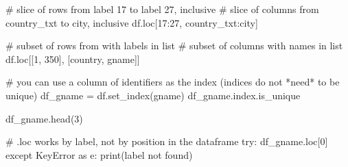 \documentclass[
  letterpaper,
  DIV=11,
  numbers=noendperiod]{scrreprt}
\newenvironment{Shaded}{\begin{snugshade}}{\end{snugshade}}
\newcommand{\BuiltInTok}[1]{\textcolor[rgb]{0.00,0.23,0.31}{#1}}
\newcommand{\CommentTok}[1]{\textcolor[rgb]{0.37,0.37,0.37}{#1}}
\newcommand{\ControlFlowTok}[1]{\textcolor[rgb]{0.00,0.23,0.31}{#1}}
\newcommand{\DecValTok}[1]{\textcolor[rgb]{0.68,0.00,0.00}{#1}}
\newcommand{\ImportTok}[1]{\textcolor[rgb]{0.00,0.46,0.62}{#1}}
\newcommand{\NormalTok}[1]{\textcolor[rgb]{0.00,0.23,0.31}{#1}}
\newcommand{\OperatorTok}[1]{\textcolor[rgb]{0.37,0.37,0.37}{#1}}
\newcommand{\PreprocessorTok}[1]{\textcolor[rgb]{0.68,0.00,0.00}{#1}}
\newcommand{\StringTok}[1]{\textcolor[rgb]{0.13,0.47,0.30}{#1}}
\begin{document}
\begin{Shaded}
\begin{Highlighting}[]
\CommentTok{\# slice of rows from label 17 to label 27, inclusive}
\CommentTok{\# slice of columns from country\_txt to city, inclusive}
\NormalTok{df.loc[}\DecValTok{17}\NormalTok{:}\DecValTok{27}\NormalTok{, }\StringTok{\textquotesingle{}country\_txt\textquotesingle{}}\NormalTok{:}\StringTok{\textquotesingle{}city\textquotesingle{}}\NormalTok{]}
\end{Highlighting}
\end{Shaded}

\begin{Shaded}
\begin{Highlighting}[]
\CommentTok{\# subset of rows from with labels in list}
\CommentTok{\# subset of columns with names in list}
\NormalTok{df.loc[[}\DecValTok{1}\NormalTok{, }\DecValTok{350}\NormalTok{], [}\StringTok{\textquotesingle{}country\textquotesingle{}}\NormalTok{, }\StringTok{\textquotesingle{}gname\textquotesingle{}}\NormalTok{]]}
\end{Highlighting}
\end{Shaded}

\begin{Shaded}
\begin{Highlighting}[]
\CommentTok{\# you can use a column of identifiers as the index (indices do not *need* to be unique)}
\NormalTok{df\_gname }\OperatorTok{=}\NormalTok{ df.set\_index(}\StringTok{\textquotesingle{}gname\textquotesingle{}}\NormalTok{)}
\NormalTok{df\_gname.index.is\_unique}
\end{Highlighting}
\end{Shaded}

\begin{Shaded}
\begin{Highlighting}[]
\NormalTok{df\_gname.head(}\DecValTok{3}\NormalTok{)}
\end{Highlighting}
\end{Shaded}

\begin{Shaded}
\begin{Highlighting}[]
\CommentTok{\# .loc works by label, not by position in the dataframe}
\ControlFlowTok{try}\NormalTok{:}
\NormalTok{    df\_gname.loc[}\DecValTok{0}\NormalTok{]}
\ControlFlowTok{except} \PreprocessorTok{KeyError} \ImportTok{as}\NormalTok{ e:}
    \BuiltInTok{print}\NormalTok{(}\StringTok{\textquotesingle{}label not found\textquotesingle{}}\NormalTok{)}
\end{Highlighting}
\end{Shaded}
\end{document}
